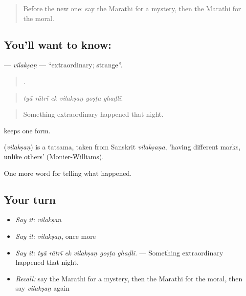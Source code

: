\label{lesson:MR-C340-vilaksan}



\begin{quote}
Before the new one: say the Marathi for a mystery, then the Marathi for the moral.
\end{quote}

\subsection*{You'll want to know: }
\textbf{} — \emph{vilakṣaṇ} — \textquotedblleft{}extraordinary; strange\textquotedblright{}.

\begin{quote}
     .
\end{quote}

\begin{quote}
\emph{tyā rātrī ek vilakṣaṇ goṣṭa ghaḍlī.}
\end{quote}

\begin{quote}
Something extraordinary happened that night.
\end{quote}

 keeps one form.

\begin{cousinweb}
\textbf{} (\emph{vilakṣaṇ}) is a tatsama, taken from Sanskrit \emph{vilakṣaṇa}, 'having different marks, unlike others' (Monier-Williams).
\end{cousinweb}

\begin{grammarlens}[title={What you've built}]
One more word for telling what happened.
\end{grammarlens}

\subsection*{Your turn}
\begin{itemize}
\raggedright
  \item \emph{Say it:} \emph{vilakṣaṇ}
  \item \emph{Say it:} \emph{vilakṣaṇ}, once more
  \item \emph{Say it:} \emph{tyā rātrī ek vilakṣaṇ goṣṭa ghaḍlī.} — Something extraordinary happened that night.
  \item \emph{Recall:} say the Marathi for a mystery, then the Marathi for the moral, then say \emph{vilakṣaṇ} again
\end{itemize}

